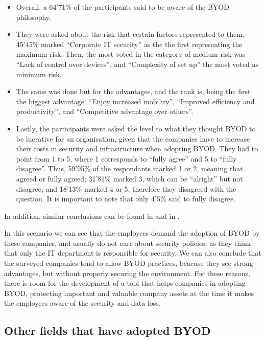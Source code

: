 \begin{itemize}
	\item Overall, a 64'71\% of the participants said to be aware of the BYOD philosophy.
	\item They were asked about the risk that certain factors represented to them. 45'45\% marked ``Corporate IT security'' as the the first representing the maximum risk. Then, the most voted in the category of medium risk was ``Lack of control over devices'', and ``Complexity of set up'' the most voted as minimum risk.
	\item The same was done but for the advantages, and the rank is, being the first the biggest advantage: ``Enjoy increased mobility'', ``Improved efficiency and productivity'', and ``Competitive advantage over others''.
	\item Lastly, the participants were asked the level to what they thought BYOD to be lucrative for an organisation, given that the companies have to increase their costs in security and infrastructure when adopting BYOD. They had to point from 1 to 5, where 1 corresponds to ``fully agree'' and 5 to ``fully disagree''. Thus, 59'95\% of the respondants marked 1 or 2, meaning that agreed or fully agreed; 31'81\% marked 3, which can be ``alright'' but not disagree; and 18'13\% marked 4 or 5, therefore they disagreed with the question. It is important to note that only 4'5\% said to fully disagree.
\end{itemize}

In addition, similar conclusions can be found in \cite{lennon2012changing} and in \cite{Garba15organisational}.

In this scenario we can see that the employees demand the adoption of BYOD by these companies, and usually do not care about security policies, as they think that only the IT department is responsible for security. We can also conclude that the surveyed companies tend to allow BYOD practices, beacuse they see strong advantages, but without properly securing the environment. For these reasons, there is room for the development of a tool that helps companies in adopting BYOD, protecting important and valuable company assets at the time it makes the employees aware of the security and data loss.

\subsection{Other fields that have adopted BYOD}
\label{subsec:byodother}


